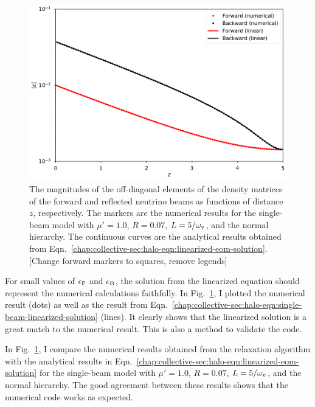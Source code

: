 \begin{figure}[htbp]
    \centering
    \includegraphics[width=\textwidth]{chapters/assets/halo/thesis-mu-1-refl-0p07}
    \caption{The magnitudes of the off-diagonal elements of the density matrices of the forward and reflected neutrino beams as functions of distance $z$, respectively. The markers are the numerical results for the single-beam model with $\mu'= 1.0$, $R=0.07$, $L=5/\omega_\mathrm v$, and the normal hierarchy. The continuous curves are the analytical results obtained from Eqn.~\eqref{chap:collective-sec:halo-eqn:linearized-eom-solution}. [Change forward markers to squares, remove legends]}
    \label{chap:halo-sec:line-sym-fig:mu-1.0-reflection-0.07}
\end{figure}


For small values of $\epsilon_{\mathrm F}$ and $\epsilon_\mathrm B$, the solution from the linearized equation should represent the numerical calculations faithfully. In Fig.~\ref{chap:halo-sec:line-sym-fig:mu-1.0-reflection-0.07}, I plotted the numerical result (dots) as well as the result from Eqn.~\eqref{chap:collective-sec:halo-eqn:single-beam-linearized-solution} (lines). It clearly shows that the linearized solution is a great match to the numerical result. This is also a method to validate the code.





In Fig.~\ref{chap:halo-sec:line-sym-fig:mu-1.0-reflection-0.07}, I compare the numerical results obtained from the relaxation algorithm with the analytical results in Eqn.~\eqref{chap:collective-sec:halo-eqn:linearized-eom-solution} for the single-beam model with $\mu'= 1.0$, $R=0.07$, $L=5/\omega_\mathrm v$, and the normal hierarchy. The good agreement between these results shows that the numerical code works as expected.

